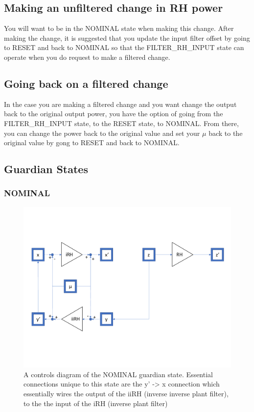 \documentclass{article}
\begin{document}
\subsection{Making an unfiltered change in RH power}
You will want to be in the NOMINAL state when making this change. After making the change, it is suggested that you update the input filter offset by going to RESET and back to NOMINAL so that the FILTER\_RH\_INPUT state can operate when you do request to make a filtered change. 

\subsection{Going back on a filtered change}
In the case you are making a filtered change and you want change the output back to the original output power, you have the option of going from the FILTER\_RH\_INPUT state, to the RESET state, to NOMINAL. From there, you can change the power back to the original value and set your $\mu$ back to the original value by gong to RESET and back to NOMINAL.

\subsection{Guardian States}
\subsubsection{NOMINAL}
\begin{figure}[H]
    \centering
    \includegraphics[width=1\textwidth]{NOMINAL_DIAGRAM.pdf}
    \caption{A controls diagram of the NOMINAL guardian state. Essential connections unique to this state are the y' -> x connection which essentially wires the output of the iiRH (inverse inverse plant filter), to the the input of the iRH (inverse plant filter)}
\end{figure}
\end{document}

